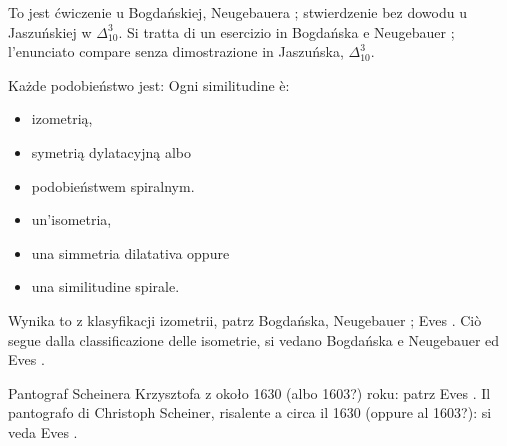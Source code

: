 To jest ćwiczenie u Bogdańskiej, Neugebauera \cite[s. 217]{neugebauer_2018}; stwierdzenie bez dowodu u Jaszuńskiej w $\Delta_{10}^3$. %
Si tratta di un esercizio in Bogdańska e Neugebauer \cite[p.~217]{neugebauer_2018}; l'enunciato compare senza dimostrazione in Jaszuńska, $\Delta_{10}^3$. %

\begin{proposition}
\label{podobienstwa_klasyfikacja}%
    Każde podobieństwo jest: %
    Ogni similitudine è: %
    \begin{itemize}
        \item izometrią, %
        \item symetrią dylatacyjną albo %
        \item podobieństwem spiralnym. %
        \item un'isometria, %
        \item una simmetria dilatativa oppure %
        \item una similitudine spirale. %
    \end{itemize}
\end{proposition}

Wynika to z klasyfikacji izometrii, patrz Bogdańska, Neugebauer \cite[s. 220]{neugebauer_2018}; Eves \cite[s. 118]{eves1_1972}. %
Ciò segue dalla classificazione delle isometrie, si vedano Bogdańska e Neugebauer \cite[p.~220]{neugebauer_2018} ed Eves \cite[p.~118]{eves1_1972}. %

Pantograf Scheinera Krzysztofa z około 1630 (albo 1603?) roku: patrz Eves \cite[s. 107]{eves1_1972}. %
Il pantografo di Christoph Scheiner, risalente a circa il 1630 (oppure al 1603?): si veda Eves \cite[p.~107]{eves1_1972}. %

